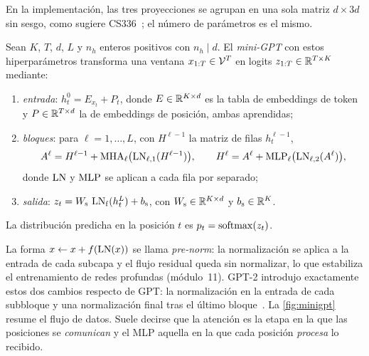 En la implementación, las tres proyecciones se agrupan en una sola matriz $d\times 3d$ sin sesgo, como sugiere CS336~\cite[§3.4]{cs336}; el número de parámetros es el mismo.

\begin{definicion}\label{def:minigpt}
Sean $K$, $T$, $d$, $L$ y $n_h$ enteros positivos con $n_h\mid d$. El \emph{mini-GPT} con estos hiperparámetros transforma una ventana $x_{1:T}\in\mathcal{V}^{T}$ en logits $z_{1:T}\in\mathbb{R}^{T\times K}$ mediante:
\begin{enumerate}[label=(\arabic*)]
  \item \emph{entrada}: $h^{0}_t=E_{x_t}+P_t$, donde $E\in\mathbb{R}^{K\times d}$ es la tabla de embeddings de token y $P\in\mathbb{R}^{T\times d}$ la de embeddings de posición, ambas aprendidas;
  \item \emph{bloques}: para $\ell=1,\dots,L$, con $H^{\ell-1}$ la matriz de filas $h^{\ell-1}_t$,
  \[
  A^{\ell}=H^{\ell-1}+\operatorname{MHA}_{\ell}\bigl(\operatorname{LN}_{\ell,1}(H^{\ell-1})\bigr),\qquad
  H^{\ell}=A^{\ell}+\operatorname{MLP}_{\ell}\bigl(\operatorname{LN}_{\ell,2}(A^{\ell})\bigr),
  \]
  donde $\operatorname{LN}$ y $\operatorname{MLP}$ se aplican a cada fila por separado;
  \item \emph{salida}: $z_t=W_{\mathrm{s}}\,\operatorname{LN}_{\mathrm{f}}(h^{L}_t)+b_{\mathrm{s}}$, con $W_{\mathrm{s}}\in\mathbb{R}^{K\times d}$ y $b_{\mathrm{s}}\in\mathbb{R}^{K}$.
\end{enumerate}
La distribución predicha en la posición $t$ es $p_t=\operatorname{softmax}(z_t)$.
\end{definicion}

La forma $x\leftarrow x+f(\operatorname{LN}(x))$ se llama \emph{pre-norm}: la normalización se aplica a la entrada de cada subcapa y el flujo residual queda sin normalizar, lo que estabiliza el entrenamiento de redes profundas (módulo~11). GPT-2 introdujo exactamente estos dos cambios respecto de GPT: la normalización en la entrada de cada subbloque y una normalización final tras el último bloque~\cite[§2.3]{gpt2}. La \cref{fig:minigpt} resume el flujo de datos. Suele decirse que la atención es la etapa en la que las posiciones se \emph{comunican} y el MLP aquella en la que cada posición \emph{procesa} lo recibido.

